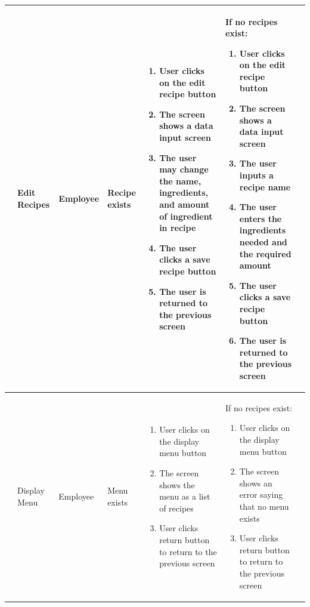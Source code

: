 \begin{landscape}
\begin{longtable}{|p{}|p{}|p{}|p{}|p{}|p{}|p{}|}
	 \rownumber & Edit Recipes & Employee & Recipe exists & 
	\begin{enumerate}[wide, labelwidth=!, labelindent=0pt, nosep, topsep=0pt, parsep=0pt]
		\item User clicks on the edit recipe button
		\item The screen shows a data input screen
		\item The user may change the name, ingredients, and amount of ingredient in recipe
		\item The user clicks a save recipe button
		\item The user is returned to the previous screen
	\end{enumerate} & If no recipes exist:\begin{enumerate}[wide, labelwidth=!, labelindent=0pt, nosep, topsep=0pt, parsep=0pt]
		\item User clicks on the edit recipe button
		\item The screen shows a data input screen
		\item The user inputs a recipe name
		\item The user enters the ingredients needed and the required amount
		\item The user clicks a save recipe button
		\item The user is returned to the previous screen
	\end{enumerate} & \\\hline

	 \rownumber & Display Menu & Employee & Menu exists & 
	\begin{enumerate}[wide, labelwidth=!, labelindent=0pt, nosep, topsep=0pt, parsep=0pt]
		\item User clicks on the display menu button
		\item The screen shows the menu as a list of recipes
		\item User clicks return button to return to the previous screen
	\end{enumerate} & If no recipes exist:\begin{enumerate}[wide, labelwidth=!, labelindent=0pt, nosep, topsep=0pt, parsep=0pt]
		\item User clicks on the display menu button
		\item The screen shows an error saying that no menu exists
		\item User clicks return button to return to the previous screen
	\end{enumerate} & \\\hline


\end{longtable}
\end{landscape}
